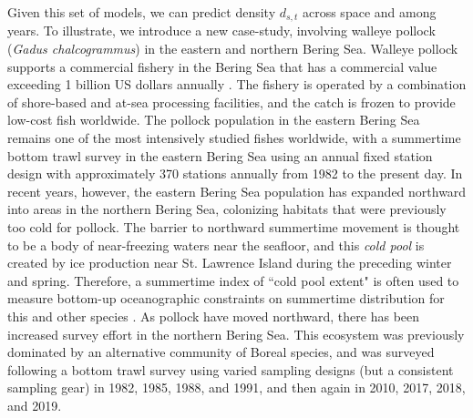 Given this set of models, we can predict density \(d_{s,t}\) across space and among years. To illustrate, we introduce a new case-study, involving walleye pollock (\textit{Gadus chalcogrammus}) in the eastern and northern Bering Sea.  Walleye pollock supports a commercial fishery in the Bering Sea that has a commercial value exceeding 1 billion US dollars annually \cite{bailey_billion-dollar_2013}.  The fishery is operated by a combination of shore-based and at-sea processing facilities, and the catch is frozen to provide low-cost fish worldwide.  The pollock population in the eastern Bering Sea remains one of the most intensively studied fishes worldwide, with a summertime bottom trawl survey in the eastern Bering Sea using an annual fixed station design with approximately 370 stations annually from 1982 to the present day. In recent years, however, the eastern Bering Sea population has expanded northward into areas in the northern Bering Sea, colonizing habitats that were previously too cold for pollock.  The barrier to northward summertime movement is thought to be a body of near-freezing waters near the seafloor, and this \textit{cold pool} is created by ice production near St. Lawrence Island during the preceding winter and spring.  Therefore, a summertime index of ``cold pool extent" is often used to measure bottom-up oceanographic constraints on summertime distribution for this and other species \cite{gruss_synthesis_2021}.  As pollock have moved northward, there has been increased survey effort in the northern Bering Sea.  This ecosystem was previously dominated by an alternative community of Boreal species, and was surveyed following a bottom trawl survey using varied sampling designs (but a consistent sampling gear) in 1982, 1985, 1988, and 1991, and then again in 2010, 2017, 2018, and 2019.   

